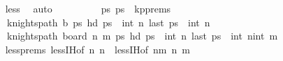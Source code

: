 \begin{isabellebody}
\ \ \ \ \ \ \ \ \isamarkupfalse%
\ less\ \isamarkupfalse%
\ auto\isanewline
\ \ \ \ \ \ \isamarkupfalse%
\ \isamarkupfalse%
\ ps\ ps\ \ kp{\isacharunderscore}{\kern0pt}prems{\isacharcolon}{\kern0pt}\ \isanewline
\ \ \ \ \ \ \ \ \ \ {\isachardoublequoteopen}knights{\isacharunderscore}{\kern0pt}path\ {\isacharquery}{\kern0pt}b\ ps\ {\isachardoublequoteopen}hd\ ps\ {\isacharequal}{\kern0pt}\ {\isacharparenleft}{\kern0pt}int\ n{\isacharcomma}{\kern0pt}{}{\isacharparenright}{\kern0pt}{\isachardoublequoteclose}\ {\isachardoublequoteopen}last\ ps\ {\isacharequal}{\kern0pt}\ {\isacharparenleft}{\kern0pt}int\ n{\isacharminus}{\kern0pt}{}{\isacharcomma}{\kern0pt}{}{\isacharparenright}{\kern0pt}{\isachardoublequoteclose}\isanewline
\ \ \ \ \ \ \ \ \ \ {\isachardoublequoteopen}knights{\isacharunderscore}{\kern0pt}path\ {\isacharparenleft}{\kern0pt}board\ n\ {\isacharparenleft}{\kern0pt}m{\isacharminus}{\kern0pt}{}{\isacharparenright}{\kern0pt}{\isacharparenright}{\kern0pt}\ ps\ {\isachardoublequoteopen}hd\ ps\ {\isacharequal}{\kern0pt}\ {\isacharparenleft}{\kern0pt}int\ n{\isacharcomma}{\kern0pt}{}{\isacharparenright}{\kern0pt}{\isachardoublequoteclose}\ {\isachardoublequoteopen}last\ ps\ {\isacharequal}{\kern0pt}\ {\isacharparenleft}{\kern0pt}int\ n{\isacharminus}{\kern0pt}{}{\isacharcomma}{\kern0pt}int\ {\isacharparenleft}{\kern0pt}m{\isacharminus}{\kern0pt}{}{\isacharparenright}{\kern0pt}{\isacharminus}{\kern0pt}{}{\isacharparenright}{\kern0pt}{\isachardoublequoteclose}\isanewline
\ \ \ \ \ \ \ \ \isamarkupfalse%
\ less{\isachardot}{\kern0pt}prems\ less{\isachardot}{\kern0pt}IH{\isacharbrackleft}{\kern0pt}of\ {\isachardoublequoteopen}n{\isacharplus}{\kern0pt}{}{\isachardoublequoteclose}\ n\ {\isachardoublequoteopen}{}{\isachardoublequoteclose}{\isacharbrackright}{\kern0pt}\ less{\isachardot}{\kern0pt}IH{\isacharbrackleft}{\kern0pt}of\ {\isachardoublequoteopen}n{\isacharplus}{\kern0pt}{\isacharparenleft}{\kern0pt}m{\isacharminus}{\kern0pt}{}{\isacharparenright}{\kern0pt}{\isachardoublequoteclose}\ n\ {\isachardoublequoteopen}m{\isacharminus}{\kern0pt}{}{\isachardoublequoteclose}{\isacharbrackright}{\kern0pt}\ \isamarkupfalse%

\end{isabellebody}
